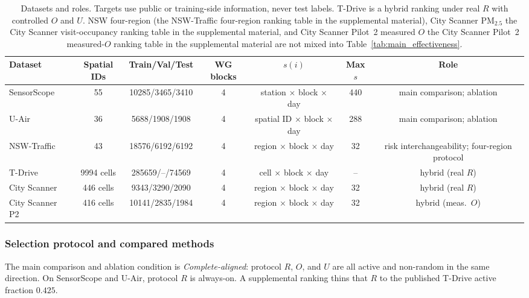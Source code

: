 \documentclass[letterpaper,journal]{IEEEtran}
\begin{document}
\begin{table}[t]
\centering
\caption{Datasets and roles.  Targets use public or training-side
information, never test labels.  T-Drive is a hybrid ranking under real
$R$ with controlled $O$ and $U$.  NSW four-region
(the NSW-Traffic four-region ranking table in the supplemental material), City Scanner {PM}$_{2.5}$
the City Scanner visit-occupancy ranking table in the supplemental material, and City Scanner Pilot~2 measured
$O$ the City Scanner Pilot~2 measured-$O$ ranking table in the supplemental material are not mixed into
Table~\ref{tab:main_effectiveness}.}
\label{tab:datasets}
\scriptsize
\setlength{\tabcolsep}{3.2pt}
\begin{tabular*}{\textwidth}{@{\extracolsep{\fill}}lcccccc}
\toprule
Dataset & Spatial IDs & Train/Val/Test & WG blocks &
$s(i)$ & Max $s$ & Role\\
\midrule
SensorScope~\cite{ingelrest2010sensorscope} & 55 & 10285/3465/3410 & 4 &
station $\times$ block $\times$ day & 440 & main comparison; ablation\\
U-Air~\cite{zheng2013uair} & 36 & 5688/1908/1908 & 4 &
spatial ID $\times$ block $\times$ day & 288 & main comparison; ablation\\
NSW-Traffic~\cite{tfnsw2024traffic} & 43 & 18576/6192/6192 & 4 &
region $\times$ block $\times$ day & 32 & risk interchangeability; four-region protocol\\
T-Drive~\cite{yuan2010tdrive} & 9994 cells & 285659/--/74569 & 4 &
cell $\times$ block $\times$ day & -- & hybrid (real $R$)\\
City Scanner~\cite{wang2023cityscanner} & 446 cells & 9343/3290/2090 & 4 &
region $\times$ block $\times$ day & 32 & hybrid (real $R$)\\
City Scanner P2 & 416 cells & 10141/2835/1984 & 4 &
region $\times$ block $\times$ day & 32 & hybrid (meas.\ $O$)\\
\bottomrule
\end{tabular*}
\end{table}

\subsubsection{Selection protocol and compared methods}

The main comparison and ablation condition is \emph{Complete-aligned}: protocol $R$, $O$,
and $U$ are all active and non-random in the same direction.  On
SensorScope and U-Air, protocol $R$ is always-on.  A supplemental ranking
thins that $R$ to the published T-Drive active fraction $0.425$.
\end{document}
